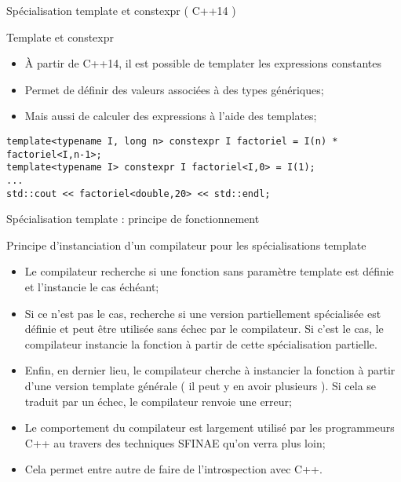 \documentclass[handout,10pt]{beamer}
\begin{document}
\begin{frame}[fragile]{Spécialisation template et constexpr ( C++14 )}
\small
\begin{block}{Template et constexpr}
\begin{itemize}
\item À partir de C++14, il est possible de templater les expressions constantes
\item Permet de définir des valeurs associées à des types génériques;
\item Mais aussi de calculer des expressions à l'aide des templates;
\end{itemize}
\begin{lstlisting}
template<typename I, long n> constexpr I factoriel = I(n) * factoriel<I,n-1>;
template<typename I> constexpr I factoriel<I,0> = I(1);
...
std::cout << factoriel<double,20> << std::endl;
\end{lstlisting}
\end{block}
\end{frame}

\begin{frame}[fragile]{Spécialisation template : principe de fonctionnement}
\small
\begin{block}{Principe d'instanciation d'un compilateur pour les spécialisations template}
\begin{itemize}
\item Le compilateur recherche si une fonction sans paramètre template est définie et l'instancie le cas échéant;
\item Si ce n'est pas le cas, recherche si une version partiellement spécialisée est définie et  peut être utilisée sans échec
par le compilateur. Si c'est le cas, le compilateur instancie la fonction à partir de cette spécialisation partielle.
\item Enfin, en dernier lieu, le compilateur cherche à instancier la fonction à partir d'une version template générale ( il peut
y en avoir plusieurs ). Si cela se traduit par un échec, le compilateur renvoie une erreur;
\item Le comportement du compilateur est largement utilisé par les programmeurs C++ au travers des techniques SFINAE qu'on verra plus loin;
\item Cela permet entre autre de faire de l'introspection avec C++.
\end{itemize}
\end{block}
\end{frame}
\end{document}
